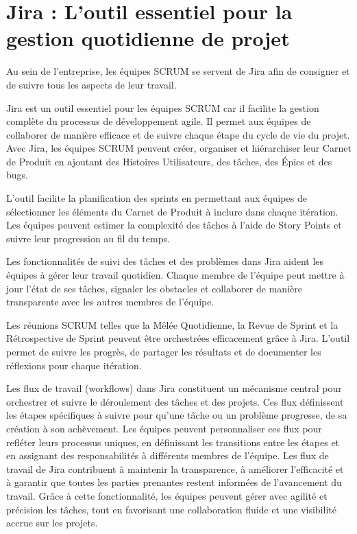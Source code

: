 \section[Jira : L'outil essentiel pour la gestion de projet]{Jira : L'outil essentiel pour la gestion quotidienne de projet}\label{sec:jira}

Au sein de l'entreprise, les équipes SCRUM se servent de Jira afin de consigner et de suivre tous les aspects de leur travail.

Jira est un outil essentiel pour les équipes SCRUM car il facilite la gestion complète du processus de développement agile. Il permet aux équipes de collaborer de manière efficace et de suivre chaque étape du cycle de vie du projet. Avec Jira, les équipes SCRUM peuvent créer, organiser et hiérarchiser leur Carnet de Produit en ajoutant des Histoires Utilisateurs, des tâches, des Épics et des bugs.

L'outil facilite la planification des sprints en permettant aux équipes de sélectionner les éléments du Carnet de Produit à inclure dans chaque itération. Les équipes peuvent estimer la complexité des tâches à l'aide de Story Points et suivre leur progression au fil du temps.

Les fonctionnalités de suivi des tâches et des problèmes dans Jira aident les équipes à gérer leur travail quotidien. Chaque membre de l'équipe peut mettre à jour l'état de ses tâches, signaler les obstacles et collaborer de manière transparente avec les autres membres de l'équipe.

Les réunions SCRUM telles que la Mêlée Quotidienne, la Revue de Sprint et la Rétrospective de Sprint peuvent être orchestrées efficacement grâce à Jira. L'outil permet de suivre les progrès, de partager les résultats et de documenter les réflexions pour chaque itération.

Les flux de travail (workflows) dans Jira constituent un mécanisme central pour orchestrer et suivre le déroulement des tâches et des projets. Ces flux définissent les étapes spécifiques à suivre pour qu'une tâche ou un problème progresse, de sa création à son achèvement. Les équipes peuvent personnaliser ces flux pour refléter leurs processus uniques, en définissant les transitions entre les étapes et en assignant des responsabilités à différents membres de l'équipe. Les flux de travail de Jira contribuent à maintenir la transparence, à améliorer l'efficacité et à garantir que toutes les parties prenantes restent informées de l'avancement du travail. Grâce à cette fonctionnalité, les équipes peuvent gérer avec agilité et précision les tâches, tout en favorisant une collaboration fluide et une visibilité accrue sur les projets.

